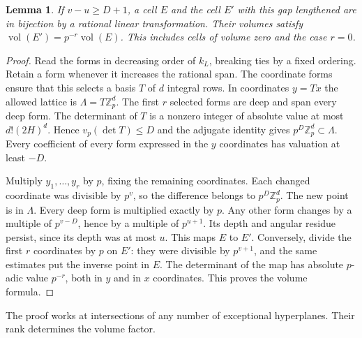 \documentclass[11pt]{article}
\newtheorem{lemma}[theorem]{Lemma}
\newcommand{\Z}{\mathbb Z}
\newcommand{\vol}{\operatorname{vol}}
\begin{document}
\begin{lemma}\label{gap}
If $v-u\ge D+1$, a cell $E$ and the cell $E'$ with this gap lengthened are in bijection by a rational linear transformation. Their volumes satisfy $\vol(E')=p^{-r}\vol(E)$. This includes cells of volume zero and the case $r=0$.
\end{lemma}
\begin{proof}
Read the forms in decreasing order of $k_L$, breaking ties by a fixed ordering. Retain a form whenever it increases the rational span. The coordinate forms ensure that this selects a basis $T$ of $d$ integral rows. In coordinates $y=Tx$ the allowed lattice is $\Lambda=T\Z_p^d$. The first $r$ selected forms are deep and span every deep form. The determinant of $T$ is a nonzero integer of absolute value at most $d!(2H)^d$. Hence $v_p(\det T)\le D$ and the adjugate identity gives $p^D\Z_p^d\subset\Lambda$. Every coefficient of every form expressed in the $y$ coordinates has valuation at least $-D$.

Multiply $y_1,\ldots,y_r$ by $p$, fixing the remaining coordinates. Each changed coordinate was divisible by $p^v$, so the difference belongs to $p^D\Z_p^d$. The new point is in $\Lambda$. Every deep form is multiplied exactly by $p$. Any other form changes by a multiple of $p^{v-D}$, hence by a multiple of $p^{u+1}$. Its depth and angular residue persist, since its depth was at most $u$. This maps $E$ to $E'$. Conversely, divide the first $r$ coordinates by $p$ on $E'$: they were divisible by $p^{v+1}$, and the same estimates put the inverse point in $E$. The determinant of the map has absolute $p$-adic value $p^{-r}$, both in $y$ and in $x$ coordinates. This proves the volume formula.
\end{proof}

The proof works at intersections of any number of exceptional hyperplanes. Their rank determines the volume factor.
\end{document}
